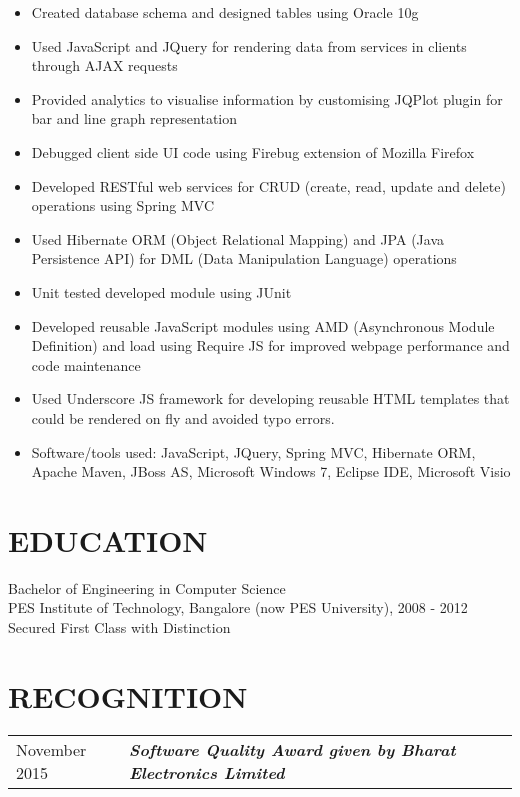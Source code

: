 \documentclass[line, margin]{res}
\begin{document}
\begin{resume}
\begin{itemize}
  \item Created database schema and designed tables using Oracle 10g
  \item Used JavaScript and JQuery for rendering data from services in clients through AJAX requests
  \item Provided analytics to visualise information by customising JQPlot plugin for bar and line graph representation
  \item Debugged client side UI code using Firebug extension of Mozilla Firefox
  \item Developed RESTful web services for CRUD (create, read, update and delete) operations using Spring MVC
  \item Used Hibernate ORM (Object Relational Mapping) and JPA (Java Persistence API) for DML (Data Manipulation Language) operations
  \item Unit tested developed module using JUnit
  \item Developed reusable JavaScript modules using AMD (Asynchronous Module Definition) and load using Require JS for improved webpage performance and code maintenance
  \item Used Underscore JS framework for developing reusable HTML templates that could be rendered on fly and avoided typo errors.
    \item Software/tools used: JavaScript, JQuery, Spring MVC, Hibernate ORM, Apache Maven, JBoss AS, Microsoft Windows 7, Eclipse IDE, Microsoft Visio
    \end{itemize}
    \section{EDUCATION}
    Bachelor of Engineering in Computer Science \\
    PES Institute of Technology, Bangalore (now PES University), 2008 - 2012 \\
    Secured First Class with Distinction
    \section{RECOGNITION}
    \begin{tabular}{l l}
      November 2015 & \textbf{\textit{Software Quality Award given by Bharat Electronics Limited}} \\ [5pt]
    \end{tabular}
\end{resume}
\end{document}
